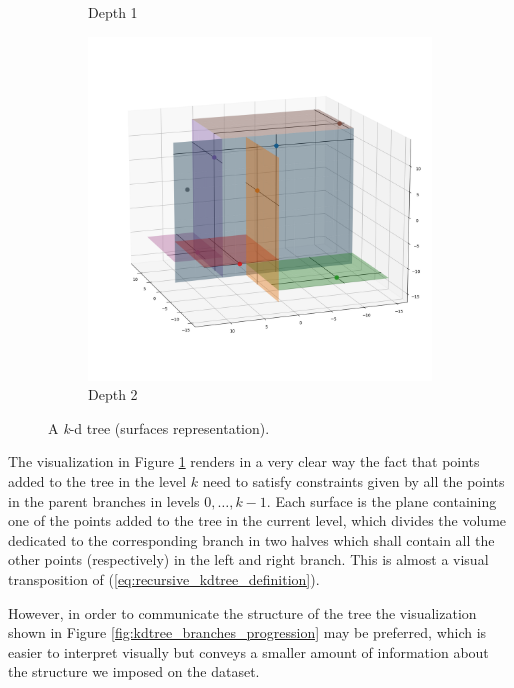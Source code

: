 \documentclass{article}
\newcommand{\kdtree}{\emph{k}-d tree}
\begin{document}
\begin{figure}[b!]
{\begin{subfigure}{.4\textwidth}
            \caption{Depth 1}
        \end{subfigure}
        \hfill
        \begin{subfigure}{.4\textwidth}
            \centering
            \includegraphics[width=\linewidth]{kd_tree_progress_img2.png}
            \caption{Depth 2}
        \end{subfigure}
    }
    \caption{A \kdtree{} (surfaces representation).}
    \label{fig:kdtree_surfaces_progression}
\end{figure}

The visualization in Figure \ref{fig:kdtree_surfaces_progression} renders in a
very clear way the fact that points added to the tree in the level $k$ need to
satisfy constraints given by all the points in the parent branches in levels
$0, \dots, k-1$. Each surface is the plane containing one of the points
added to the tree in the current level, which divides the volume dedicated to
the corresponding branch in two halves which shall contain all the other points
(respectively) in the left and right branch. This is almost a visual
transposition of (\ref*{eq:recursive_kdtree_definition}).

However, in order to communicate the structure of the tree
the visualization shown in Figure \ref{fig:kdtree_branches_progression} may be
preferred, which is easier to interpret visually but conveys a smaller amount
of information about the structure we imposed on the dataset.
\end{document}
